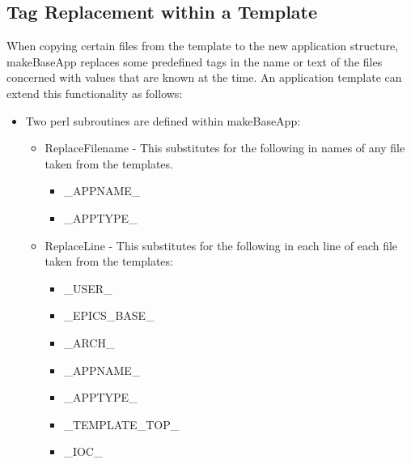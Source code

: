 \subsection{Tag Replacement within a Template}

When copying certain files from the template to the new application structure, makeBaseApp replaces some predefined 
tags in the name or text of the files concerned with values that are known at the time. An application template can extend 
this functionality as follows:

\begin{itemize}

\item Two perl subroutines are defined within makeBaseApp:

\begin{itemize}

\item ReplaceFilename - This substitutes for the following in names of any file taken from the templates.                 

\begin{itemize}

\item \_APPNAME\_  

\item \_APPTYPE\_

\end{itemize}

\item ReplaceLine - This substitutes for the following in each line of each file taken from the templates:                 
\begin{itemize}

\item \_USER\_  

\item  \_EPICS\_BASE\_ 

\item  \_ARCH\_ 

\item  \_APPNAME\_ 

\item  \_APPTYPE\_ 

\item  \_TEMPLATE\_TOP\_ 

\item  \_IOC\_ 

\end{itemize}

\end{itemize}


\end{itemize}

